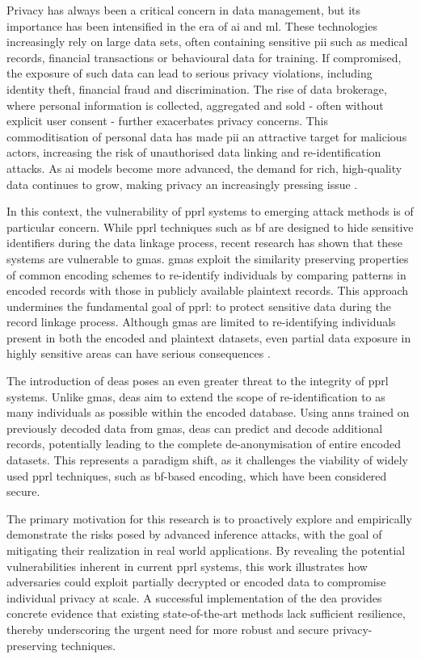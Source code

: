 Privacy has always been a critical concern in data management, but its importance has been intensified in the era of \ac{ai} and \ac{ml}.
These technologies increasingly rely on large data sets, often containing sensitive \ac{pii} such as medical records, financial transactions or behavioural data for training. If compromised, the exposure of such data can lead to serious privacy violations, including identity theft, financial fraud and discrimination.
The rise of data brokerage, where personal information is collected, aggregated and sold - often without explicit user consent - further exacerbates privacy concerns.
This commoditisation of personal data has made \ac{pii} an attractive target for malicious actors, increasing the risk of unauthorised data linking and re-identification attacks.
As \ac{ai} models become more advanced, the demand for rich, high-quality data continues to grow, making privacy an increasingly pressing issue \cite{king2024rethinking, manheim2019artificial}.

In this context, the vulnerability of \ac{pprl} systems to emerging attack methods is of particular concern.
While \ac{pprl} techniques such as \ac{bf} are designed to hide sensitive identifiers during the data linkage process, recent research has shown that these systems are vulnerable to \ac{gma}s.
\ac{gma}s exploit the similarity preserving properties of common encoding schemes to re-identify individuals by comparing patterns in encoded records with those in publicly available plaintext records.
This approach undermines the fundamental goal of \ac{pprl}: to protect sensitive data during the record linkage process.
Although \ac{gma}s are limited to re-identifying individuals present in both the encoded and plaintext datasets, even partial data exposure in highly sensitive areas can have serious consequences \cite{schaefer2024,vidanage2020graph}.

The introduction of \ac{dea}s poses an even greater threat to the integrity of \ac{pprl} systems.
Unlike \ac{gma}s, \ac{dea}s aim to extend the scope of re-identification to as many individuals as possible within the encoded database.
Using \ac{ann}s trained on previously decoded data from \ac{gma}s, \ac{dea}s can predict and decode additional records, potentially leading to the complete de-anonymisation of entire encoded datasets.
This represents a paradigm shift, as it challenges the viability of widely used \ac{pprl} techniques, such as \ac{bf}-based encoding, which have been considered secure.

The primary motivation for this research is to proactively explore and empirically demonstrate the risks posed by advanced inference attacks, with the goal of mitigating their realization in real world applications.
By revealing the potential vulnerabilities inherent in current \ac{pprl} systems, this work illustrates how adversaries could exploit partially decrypted or encoded data to compromise individual privacy at scale.
A successful implementation of the \ac{dea} provides concrete evidence that existing state-of-the-art methods lack sufficient resilience, thereby underscoring the urgent need for more robust and secure privacy-preserving techniques.


